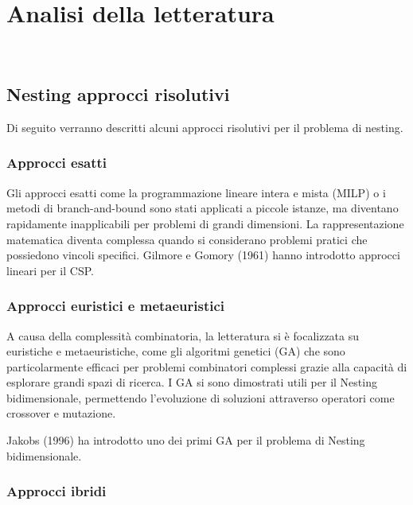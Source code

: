\chapter{Analisi della letteratura}
\label{cap:descrizione-stage}

\\

\section{Nesting approcci risolutivi}

Di seguito verranno descritti alcuni approcci risolutivi per il problema di nesting. 

\subsection{Approcci esatti}

Gli approcci esatti come la programmazione lineare intera e mista (MILP) o i metodi di branch-and-bound sono stati applicati a piccole istanze, ma diventano rapidamente inapplicabili per problemi di grandi dimensioni. La rappresentazione matematica diventa complessa quando si considerano problemi pratici che possiedono vincoli specifici.
Gilmore e Gomory (1961) hanno introdotto approcci lineari per il CSP.

\subsection{Approcci euristici e metaeuristici}

A causa della complessità combinatoria, la letteratura si è focalizzata su euristiche e metaeuristiche, come gli algoritmi genetici (GA) che sono particolarmente efficaci per problemi combinatori complessi grazie alla capacità di esplorare grandi spazi di ricerca. I GA si sono dimostrati utili per il Nesting bidimensionale, permettendo l'evoluzione di soluzioni attraverso operatori come crossover e mutazione.

Jakobs (1996) ha introdotto uno dei primi GA per il problema di Nesting bidimensionale.

\subsection{Approcci ibridi}

